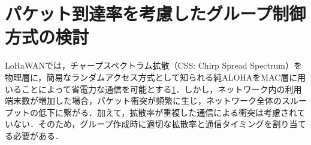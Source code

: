\section{パケット到達率を考慮したグループ制御方式の検討}
LoRaWANでは，チャープスペクトラム拡散（CSS: Chirp Spread Spectrum）を物理層に，簡易なランダムアクセス方式として知られる純ALOHAをMAC層に用いることによって省電力な通信を可能とする\ref{}．しかし，ネットワーク内の利用端末数が増加した場合，パケット衝突が頻繁に生じ，ネットワーク全体のスループットの低下に繋がる．加えて，拡散率が重複した通信による衝突は考慮されていない．そのため，グループ作成時に適切な拡散率と通信タイミングを割り当てる必要がある．